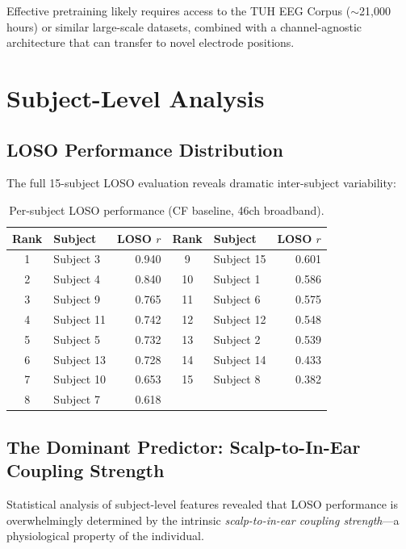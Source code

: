 \documentclass[11pt,a4paper]{article}
\begin{document}
Effective pretraining likely requires access to the TUH EEG Corpus
($\sim$21,000 hours) or similar large-scale datasets, combined with a
channel-agnostic architecture that can transfer to novel electrode
positions.

\section{Subject-Level Analysis}
\label{sec:subject}

\subsection{LOSO Performance Distribution}

The full 15-subject LOSO evaluation reveals dramatic inter-subject
variability:

\begin{table}[H]
\centering
\caption{Per-subject LOSO performance (CF baseline, 46ch broadband).}
\begin{tabular}{clr|clr}
\toprule
Rank & Subject & LOSO $r$ & Rank & Subject & LOSO $r$ \\
\midrule
1 & Subject 3 & \textcolor{good}{0.940} & 9 & Subject 15 & 0.601 \\
2 & Subject 4 & \textcolor{good}{0.840} & 10 & Subject 1 & 0.586 \\
3 & Subject 9 & 0.765 & 11 & Subject 6 & 0.575 \\
4 & Subject 11 & 0.742 & 12 & Subject 12 & 0.548 \\
5 & Subject 5 & 0.732 & 13 & Subject 2 & 0.539 \\
6 & Subject 13 & 0.728 & 14 & Subject 14 & \textcolor{bad}{0.433} \\
7 & Subject 10 & 0.653 & 15 & Subject 8 & \textcolor{bad}{0.382} \\
8 & Subject 7 & 0.618 &  &  & \\
\bottomrule
\end{tabular}
\end{table}

\subsection{The Dominant Predictor: Scalp-to-In-Ear Coupling Strength}

Statistical analysis of subject-level features revealed that LOSO
performance is overwhelmingly determined by the intrinsic
\emph{scalp-to-in-ear coupling strength}---a physiological property of
the individual.
\end{document}
